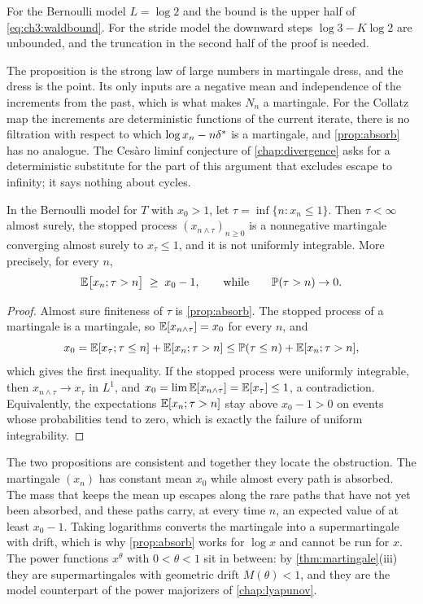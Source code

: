 For the Bernoulli model $L=\log2$ and the bound is the upper half of
\eqref{eq:ch3:waldbound}. For the stride model the downward steps
$\log3-K\log2$ are unbounded, and the truncation in the second half of the
proof is needed.

The proposition is the strong law of large numbers in martingale dress, and the
dress is the point. Its only inputs are a negative mean and independence of the
increments from the past, which is what makes $N_n$ a martingale. For the
Collatz map the increments are deterministic functions of the current iterate,
there is no filtration with respect to which $\log x_n-n\delta^{*}$ is a martingale,
and \cref{prop:absorb} has no analogue. The Ces\`aro liminf conjecture of
\cref{chap:divergence} asks for a deterministic substitute for the part of this argument that excludes escape to infinity; it says nothing about cycles.

\begin{proposition}\label{prop:uimartingale}
In the Bernoulli model for $T$ with $x_0>1$, let $\tau=\inf\{n:x_n\le1\}$. Then
$\tau<\infty$ almost surely, the stopped process $(x_{n\wedge\tau})_{n\geq0}$ is
a nonnegative martingale converging almost surely to $x_\tau\le1$, and it is
not uniformly integrable. More precisely, for every $n$,
\[
  \mathbb{E}\bigl[x_n;\tau>n\bigr]\;\geq\;x_0-1,\qquad\text{while}\qquad
  \mathbb{P}(\tau>n)\to0 .
\]
\end{proposition}

\begin{proof}
Almost sure finiteness of $\tau$ is \cref{prop:absorb}. The stopped process of a
martingale is a martingale, so $\mathbb{E}[x_{n\wedge\tau}]=x_0$ for every $n$, and
\[
  x_0=\mathbb{E}[x_\tau;\tau\le n]+\mathbb{E}[x_n;\tau>n]\le\mathbb{P}(\tau\le n)+\mathbb{E}[x_n;\tau>n],
\]
which gives the first inequality. If the stopped process were uniformly
integrable, then $x_{n\wedge\tau}\to x_\tau$ in $L^1$, and
$x_0=\lim\mathbb{E}[x_{n\wedge\tau}]=\mathbb{E}[x_\tau]\le1$, a contradiction. Equivalently,
the expectations $\mathbb{E}[x_n;\tau>n]$ stay above $x_0-1>0$ on events whose
probabilities tend to zero, which is exactly the failure of uniform
integrability.
\end{proof}

The two propositions are consistent and together they locate the
obstruction. The martingale $(x_n)$ has constant mean $x_0$ while almost every
path is absorbed. The mass that keeps the mean up escapes along the rare paths
that have not yet been absorbed, and these paths carry, at every time $n$, an
expected value of at least $x_0-1$. Taking logarithms converts the martingale
into a supermartingale with drift, which is why \cref{prop:absorb} works for
$\log x$ and cannot be run for $x$. The power functions $x^\theta$ with
$0<\theta<1$ sit in between: by \cref{thm:martingale}(iii) they are
supermartingales with geometric drift $M(\theta)<1$, and they are the model
counterpart of the power majorizers of \cref{chap:lyapunov}.

